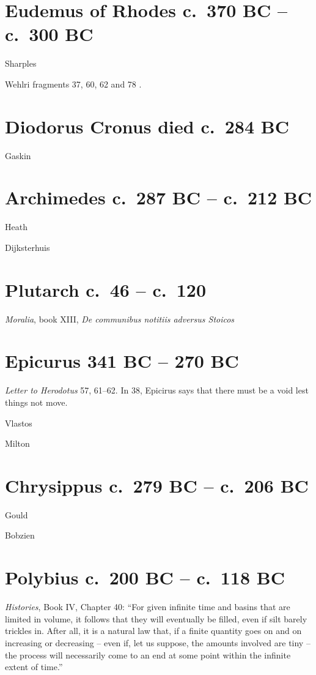 \documentclass{article}
\begin{document}
\section{Eudemus of Rhodes c.~370 BC -- c.~300 BC}
Sharples \cite{eudemus}

Wehlri fragments 37, 60, 62 and 78 \cite{wehrliVIII}.

\section{Diodorus Cronus died c.~284 BC}
Gaskin \cite[pp.~60, 64, 108, 252, 260]{gaskin}


\section{Archimedes c.~287 BC -- c.~212 BC}
Heath \cite{heatharchimedes}

Dijksterhuis \cite{dijksterhuis}

\section{Plutarch c.~46 -- c.~120}
{\em Moralia}, book XIII, {\em De communibus notitiis adversus Stoicos} \cite{moraliaXIII}



\section{Epicurus 341 BC -- 270 BC}
{\em Letter to Herodotus} 57, 61--62. In 38, Epicirus says that there must be a void lest things not move.

Vlastos \cite{vlastos1965}

Milton \cite{milton}


\section{Chrysippus c.~279 BC -- c.~206 BC}
Gould \cite[pp.~112--119, chapter V, \S 1f]{gould}

Bobzien \cite{bobzien}


\section{Polybius c.~200 BC -- c.~118 BC}
{\em Histories}, Book IV, Chapter 40: ``For given infinite time and basins that are limited in volume,
it follows that they will eventually be filled, even if silt barely trickles in. After all, it is a natural law that,
if a finite quantity goes on and on increasing or decreasing -- even if, let us suppose, the amounts involved
are tiny -- the process will necessarily come to an end at some point within the infinite extent of time.''
\end{document}
